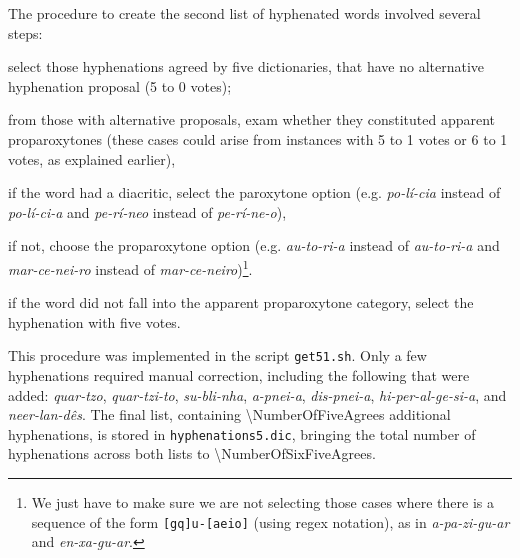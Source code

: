 The procedure to create the second list of hyphenated words involved several steps:
\begin{enumerate*}[label=\arabic*)]
  \item select those hyphenations agreed by five dictionaries, that have no alternative hyphenation proposal (5 to 0 votes);
  \item from those with alternative proposals, exam whether they constituted apparent proparoxytones (these cases could arise from instances with 5 to 1 votes or 6 to 1 votes, as explained earlier), 
      \begin{enumerate*}[label=\alph*)]
	  \item if the word had a diacritic, select the paroxytone option (e.g. \emph{po-lí-cia} instead of \emph{po-lí-ci-a} and \emph{pe-rí-neo} instead of \emph{pe-rí-ne-o}),
	  \item if not, choose the proparoxytone option (e.g. \emph{au-to-ri-a} instead of \emph{au-to-ri-a} and \emph{mar-ce-nei-ro} instead of \emph{mar-ce-neiro})\footnote{We just have to make sure we are not selecting those cases where there is a sequence of the form \texttt{[gq]u-[aeio]} (using regex notation), as in \emph{a-pa-zi-gu-ar} and \emph{en-xa-gu-ar}.}.
      \end{enumerate*}
  \item if the word did not fall into the apparent proparoxytone category, select the hyphenation with five votes.
\end{enumerate*}
This procedure was implemented in the script \texttt{get51.sh}. 
Only a few hyphenations required manual correction, including the following that were added:
\emph{quar-tzo}, \emph{quar-tzi-to}, \emph{su-bli-nha}, \emph{a-pnei-a}, \emph{dis-pnei-a}, 
\emph{hi-per-al-ge-si-a}, and \emph{neer-lan-dês}.
The final list, containing \num{\NumberOfFiveAgrees} additional hyphenations, is stored in \texttt{hyphenations5.dic}, 
bringing the total number of hyphenations across both lists to \num{\NumberOfSixFiveAgrees}.



